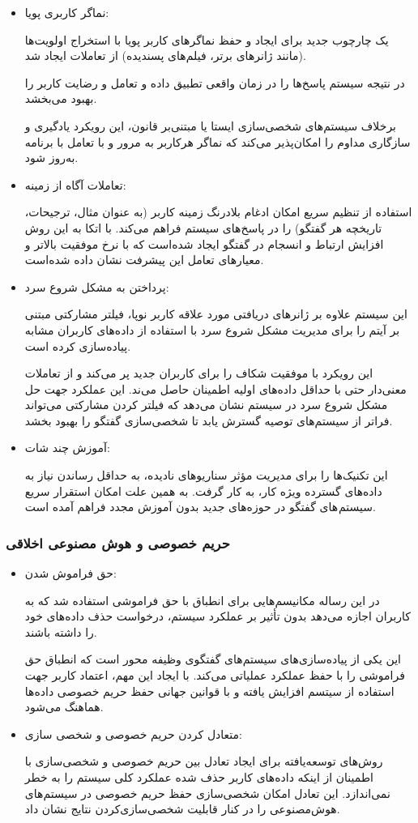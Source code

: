 \begin{itemize}
\item
 نماگر کاربری پویا:

 یک چارچوب جدید برای ایجاد و حفظ نماگر‌های کاربر پویا با استخراج اولویت‌ها (مانند ژانرهای برتر، فیلم‌های پسندیده) از تعاملات ایجاد شد.

در نتیجه سیستم پاسخ‌ها را در زمان واقعی تطبیق داده و تعامل و رضایت کاربر را بهبود می‌بخشد.

برخلاف سیستم‌های شخصی‌سازی ایستا یا مبتنی‌بر قانون، این رویکرد یادگیری و سازگاری مداوم را امکان‌پذیر می‌کند که نماگر هرکاربر به مرور و با تعامل با برنامه به‌روز شود.
\item
 تعاملات آگاه از زمینه:

استفاده از تنظیم سریع امکان ادغام بلادرنگ زمینه کاربر (به عنوان مثال، ترجیحات، تاریخچه هر گفتگو) را در پاسخ‌های سیستم فراهم می‌کند. با اتکا به این روش افزایش ارتباط و انسجام در گفتگو ایجاد شده‌است که با نرخ موفقیت بالاتر و معیارهای تعامل این پیشرفت نشان داده شده‌است.
\item
پرداختن به مشکل شروع سرد:

این سیستم علاوه بر ژانرهای دریافتی مورد علاقه کاربر نوپا، فیلتر مشارکتی مبتنی بر آیتم را برای مدیریت مشکل شروع سرد با استفاده از داده‌های کاربران مشابه پیاده‌سازی کرده است.

این رویکرد با موفقیت شکاف را برای کاربران جدید پر می‌کند و از تعاملات معنی‌دار حتی با حداقل داده‌های اولیه اطمینان حاصل می‌ند. این عملکرد جهت حل مشکل شروع سرد در سیستم نشان می‌دهد که فیلتر کردن مشارکتی می‌تواند فراتر از سیستم‌های توصیه گسترش یابد تا شخصی‌سازی گفتگو را بهبود بخشد.
\item
 آموزش چند شات:

 این تکنیک‌ها را برای مدیریت مؤثر سناریوهای نادیده، به حداقل رساندن نیاز به داده‌های گسترده ویژه کار، به کار گرفت.
به همین علت امکان استقرار سریع سیستم های گفتگو در حوزه‌های جدید بدون آموزش مجدد فراهم آمده است.
\end{itemize}


\subsubsection{حریم خصوصی و هوش مصنوعی اخلاقی}

\begin{itemize}
\item
 حق فراموش شدن:

در این رساله مکانیسم‌هایی برای انطباق با حق فراموشی استفاده شد که به کاربران اجازه می‌دهد بدون تأثیر بر عملکرد سیستم، درخواست حذف داده‌های خود را داشته باشند.

این یکی از پیاده‌سازی‌های سیستم‌های گفتگوی وظیفه محور است که انطباق حق فراموشی را با حفظ عملکرد عملیاتی می‌کند. با ایجاد این مهم، اعتماد کاربر جهت استفاده از سیتسم افزایش یافته و با قوانین جهانی حفظ حریم خصوصی داده‌ها هماهنگ می‌شود.
\item
 متعادل کردن حریم خصوصی و شخصی سازی:

روش‌های توسعه‌یافته برای ایجاد تعادل بین حریم خصوصی و شخصی‌سازی با اطمینان از اینکه داده‌های کاربر حذف شده عملکرد کلی سیستم را به خطر نمی‌اندازد. این تعادل امکان شخصی‌سازی حفظ حریم خصوصی در سیستم‌های هوش‌مصنوعی را در کنار قابلیت شخصی‌سازی‌کردن نتایج نشان داد.
\end{itemize}

